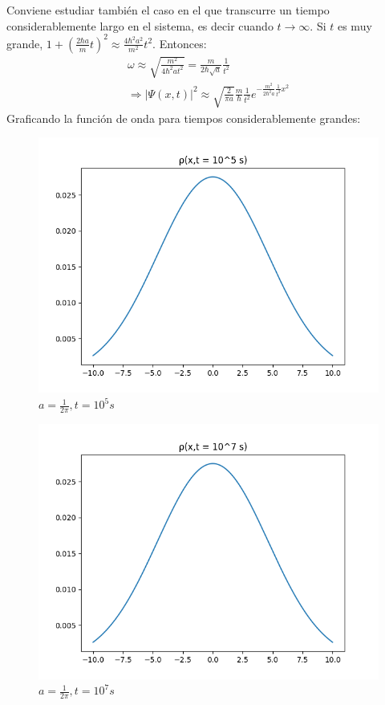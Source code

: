 Conviene estudiar también el caso en el que transcurre un tiempo considerablemente largo en el sistema, es decir cuando
$t\rightarrow\infty$. Si $t$ es muy grande, $1+\left (\frac{2\hbar a}{m}t \right )^2 \approx \frac{4\hbar^2a^2}{m^2}t^2$.
Entonces:
\begin{gather*}
    \omega \approx \sqrt{\frac{m^2}{4\hbar^2at^2}} = \frac{m}{2\hbar\sqrt{a}} \frac{1}{t^2} \\
    \Rightarrow \lvert\Psi(x,t)\rvert^2 \approx \sqrt{\frac{2}{\pi a}} \frac{m}{\hbar} \frac{1}{t^2} e^{-\frac{m^2}{2\hbar^2a} \frac{1}{t^2} x^2}
\end{gather*}
Graficando la función de onda para tiempos considerablemente grandes:\\

\begin{figure}[H]
    \includegraphics[scale=0.45]{imagenes/graficas_particulalibre/rho(x,t=10^5).png}
    \caption{\emph{$a = \frac{1}{2\pi}, t = 10^5s$}}
\end{figure}

\begin{figure}[H]
    \includegraphics[scale=0.45]{imagenes/graficas_particulalibre/rho(x,t=10^7).png}
    \caption{\emph{$a = \frac{1}{2\pi}, t = 10^7s$}}
\end{figure}

